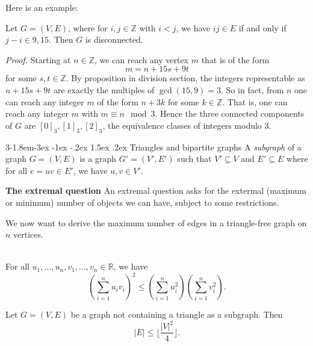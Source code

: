 \documentclass{tufte-handout}
\makeatletter
\renewcommand{\subsection}{\@startsection{subsection}%
    {3}{-1.8em}{-3ex \@plus -1ex \@minus -.2ex}%
    {1.5ex \@plus .2ex}
    {\hspace*{-5.5em}\fcolorbox{ltblue}{ltblue}{\parbox[c][1.0ex][b]{4em}{\phantom{space}}}
    \normalfont\large\itshape\color{ltblue}}}
\makeatother
\begin{document}
Here is an example:
\begin{Example}
    Let \( G = (V,E) \), where for \( i,j \in \mathbb{Z} \) with \( i<j \), we have \( ij \in E \)
    if and only if \( j-i \in {9,15} \). Then \( G \) is disconnected.
\end{Example}
\textit{Proof.}
Starting at \( n \in \mathbb{Z} \), we can reach any vertex \( m \) that is of the form \[m=n+15s+9t\]
for some \( s,t \in \mathbb{Z} \). By proposition in division section, the integers representable as
\( n+15s+9t \) are exactly the multiples of \( \gcd(15,9) = 3 \). So in fact, from \( n \) one can reach any integer \( m \)
of the form \( n+3k \) for some \( k \in \mathbb{Z} \). That is, one can reach any integer \( m \) with
\( m \equiv n \mod 3 \). Hence the three connected components of \( G \) are \( [0]_3, [1]_3,[2]_3\),
the equivalence classes of integers modulo 3. \qedsymbol

\subsection{Triangles and bipartite graphs}
A \textit{subgraph} of a graph \( G = (V,E) \) is a graph \( G' = (V',E') \) such that \( V' \subseteq V \) and \( E' \subseteq E \)
where for all \( e=uv \in E' \), we have \( u,v \in V' \).

\textbf{The extremal question} An extremal question asks for the extermal (maximum or minimum) number of objects
we can have, subject to some restrictions.

We now want to derive the maximum number of edges in a triangle-free graph on \( n \) vertices.

\begin{Theorem} \hfill\\
    For all \( u_1, \ldots, u_n, v_1, \ldots, v_n \in \mathbb{R} \), we have\[\left(\sum_{i=1}^{n} u_i v_i\right)^2 \leq \left(\sum_{i=1}^{n} u_i^2\right)\left(\sum_{i=1}^{n} v_i^2\right).\]
\end{Theorem}

\begin{Theorem}
    Let \( G = (V,E) \) be a graph not containing a triangle as a subgraph. Then
    \[ \left|E\right| \leq \lfloor \frac{\left|V\right|^2}{4} \rfloor.\]
\end{Theorem}
\end{document}

